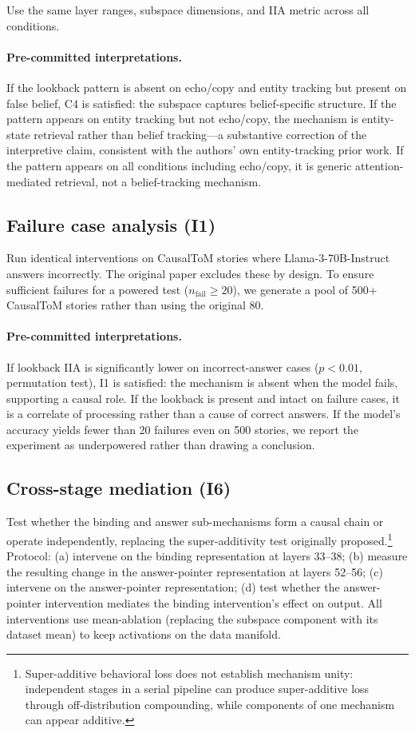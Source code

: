 \documentclass[11pt]{article}
\begin{document}
Use the same layer ranges, subspace dimensions, and IIA metric across all conditions.

\paragraph{Pre-committed interpretations.} If the lookback pattern is absent on echo/copy and entity tracking but present on false belief, C4 is satisfied: the subspace captures belief-specific structure. If the pattern appears on entity tracking but not echo/copy, the mechanism is entity-state retrieval rather than belief tracking---a substantive correction of the interpretive claim, consistent with the authors' own entity-tracking prior work. If the pattern appears on all conditions including echo/copy, it is generic attention-mediated retrieval, not a belief-tracking mechanism.

\subsection{Failure case analysis (I1)}
\label{sec:failure}

Run identical interventions on CausalToM stories where Llama-3-70B-Instruct answers incorrectly. The original paper excludes these by design. To ensure sufficient failures for a powered test ($n_{\text{fail}} \geq 20$), we generate a pool of 500+ CausalToM stories rather than using the original 80.

\paragraph{Pre-committed interpretations.} If lookback IIA is significantly lower on incorrect-answer cases ($p < 0.01$, permutation test), I1 is satisfied: the mechanism is absent when the model fails, supporting a causal role. If the lookback is present and intact on failure cases, it is a correlate of processing rather than a cause of correct answers. If the model's accuracy yields fewer than 20 failures even on 500 stories, we report the experiment as underpowered rather than drawing a conclusion.

\subsection{Cross-stage mediation (I6)}
\label{sec:mediation}

Test whether the binding and answer sub-mechanisms form a causal chain or operate independently, replacing the super-additivity test originally proposed.\footnote{Super-additive behavioral loss does not establish mechanism unity: independent stages in a serial pipeline can produce super-additive loss through off-distribution compounding, while components of one mechanism can appear additive.} Protocol: (a) intervene on the binding representation at layers 33--38; (b) measure the resulting change in the answer-pointer representation at layers 52--56; (c) intervene on the answer-pointer representation; (d) test whether the answer-pointer intervention mediates the binding intervention's effect on output. All interventions use mean-ablation (replacing the subspace component with its dataset mean) to keep activations on the data manifold.
\end{document}
